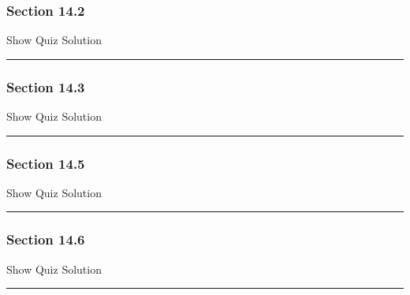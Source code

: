 \documentclass[]{article}
\begin{document}
\subsubsection{Section 14.2}\label{section-14.2}

\hypertarget{surveyElement142}{}

\hypertarget{surveyResult142}{}

Show Quiz Solution

\hypertarget{display.Quiz142.2}{}
\begin{center}\rule{0.5\linewidth}{\linethickness}\end{center}

\subsubsection{Section 14.3}\label{section-14.3}

\hypertarget{surveyElement143}{}

\hypertarget{surveyResult143}{}

Show Quiz Solution

\hypertarget{display.Quiz143.2}{}
\begin{center}\rule{0.5\linewidth}{\linethickness}\end{center}

\subsubsection{Section 14.5}\label{section-14.5}

\hypertarget{surveyElement145}{}

\hypertarget{surveyResult145}{}

Show Quiz Solution

\hypertarget{display.Quiz145.2}{}
\begin{center}\rule{0.5\linewidth}{\linethickness}\end{center}

\subsubsection{Section 14.6}\label{section-14.6}

\hypertarget{surveyElement146}{}

\hypertarget{surveyResult146}{}

Show Quiz Solution

\hypertarget{display.Quiz146.2}{}
\begin{center}\rule{0.5\linewidth}{\linethickness}\end{center}
\end{document}
